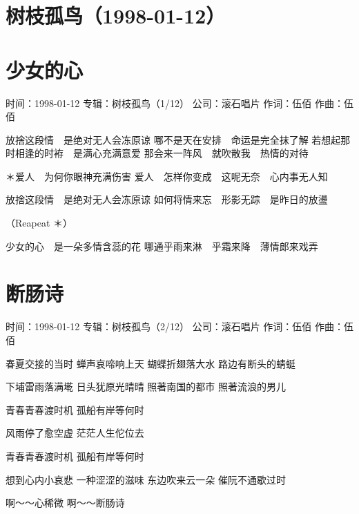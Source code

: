 \documentclass[UTF8,a4paper,oneside,twocolumn,12pt]{ctexbook}
\newcommand{\infopair}[2]{\textbullet #1：#2}
\newcommand{\zc}[1][伍佰]{\infopair{作词}{#1}}
\newcommand{\zq}[1][伍佰]{\infopair{作曲}{#1}}
\newcommand{\zj}[1]{\infopair{专辑}{#1}}
\newcommand{\sj}[1]{\infopair{时间}{#1}}
\newcommand{\gs}[1]{\infopair{公司}{#1}}
\newenvironment{info}{\begin{flushleft}\kaishu
	}
	{\end{flushleft}\normalsize\yahei\par}
\newenvironment{lyric}{
	}
{}
\begin{document}
\section*{树枝孤鸟（1998-01-12）}
\section{少女的心}
\begin{info}
	\sj{1998-01-12}
	\zj{树枝孤鸟（1/12）}
	\gs{滚石唱片}
	\zc
	\zq
\end{info}
\begin{lyric}
	放捨这段情　是绝对无人会冻原谅
	哪不是天在安排　命运是完全抹了解
	若想起那时相逢的时袸　是满心充满意爱
	那会来一阵风　就吹散我　热情的对待

	＊爱人　为何你眼神充满伤害
	爱人　怎样你变成　这呢无奈　心内事无人知

	放捨这段情　是绝对无人会冻原谅
	如何将情来忘　形影无踪　是昨日的放盪

	（Reapeat ＊）

	少女的心　是一朵多情含蕊的花
	哪通乎雨来淋　乎霜来降　薄情郎来戏弄
\end{lyric}

\section{断肠诗}
\begin{info}
	\sj{1998-01-12}
	\zj{树枝孤鸟（2/12）}
	\gs{滚石唱片}
	\zc
	\zq
\end{info}
\begin{lyric}
	春夏交接的当时
	蝉声哀啼响上天
	蝴蝶折翅落大水
	路边有断头的蜻蜓

	下埔雷雨落满墘
	日头犹原光晴晴
	照著南国的都市
	照著流浪的男儿

	青春青春渡时机
	孤船有岸等何时

	风雨停了愈空虚
	茫茫人生佗位去

	青春青春渡时机
	孤船有岸等何时

	想到心内小哀悲
	一种涩涩的滋味
	东边吹来云一朵
	催阮不通歇过时

	啊～～心稀微
	啊～～断肠诗
\end{lyric}
\end{document}
